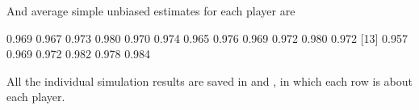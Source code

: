 \documentclass[article]{jss}
\begin{document}
And average simple unbiased estimates for each player are
\begin{CodeChunk}
\begin{CodeOutput}
 [1] 0.969 0.967 0.973 0.980 0.970 0.974 0.965 0.976 0.969 0.972 0.980 0.972 
[13] 0.957 0.969 0.972 0.982 0.978 0.984
\end{CodeOutput}
\end{CodeChunk}

All the individual simulation results are saved in  and , in which each row is about each player.




\end{document}
